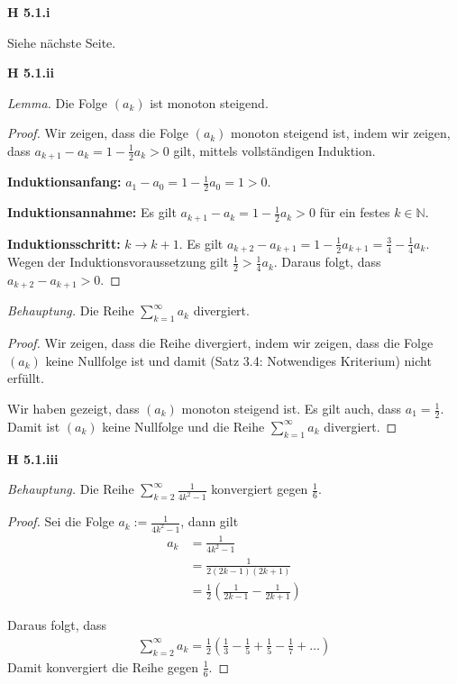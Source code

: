 \documentclass[12pt]{extarticle}
\begin{document}
\textbf{H 5.1.i}

Siehe nächste Seite.

\newpage

\textbf{H 5.1.ii}

\textit{Lemma.} Die Folge \((a_k)\) ist monoton steigend.

\begin{proof}
  Wir zeigen, dass die Folge \((a_k)\) monoton steigend ist, indem wir
  zeigen, dass \(a_{k+1}-a_k=1-\frac{1}{2}a_k>0\) gilt, mittels
  vollständigen Induktion.

  \textbf{Induktionsanfang:} \(a_1-a_0=1-\frac{1}{2}a_0=1>0\).

  \textbf{Induktionsannahme:} Es gilt \(a_{k+1}-a_k=1-\frac{1}{2}a_k>0\)
  für ein festes \(k \in \mathbb{N}\).

  \textbf{Induktionsschritt:} \(k \rightarrow k+1\). Es gilt
  \(a_{k+2}-a_{k+1}=1-\frac{1}{2}a_{k+1}=\frac{3}{4}-\frac{1}{4}a_k\).
  Wegen der Induktionsvoraussetzung gilt \(\frac{1}{2}>\frac{1}{4}a_k\).
  Daraus folgt, dass \(a_{k+2}-a_{k+1}>0\).
\end{proof}

\textit{Behauptung.}  Die Reihe \(\sum_{k=1}^{\infty}{a_k}\) divergiert.

\begin{proof}
  Wir zeigen, dass die Reihe divergiert, indem wir zeigen, dass die
  Folge \((a_k)\) keine Nullfolge ist und damit (Satz 3.4: Notwendiges
  Kriterium) nicht erfüllt.

  Wir haben gezeigt, dass \((a_k)\) monoton steigend ist.  Es gilt auch,
  dass \(a_1=\frac{1}{2}\).  Damit ist \((a_k)\) keine Nullfolge und die
  Reihe \(\sum_{k=1}^{\infty}{a_k}\) divergiert.
\end{proof}

\textbf{H 5.1.iii}

\textit{Behauptung.} Die Reihe \(\sum_{k=2}^{\infty}{\frac{1}{4k^2-1}}\)
konvergiert gegen \(\frac{1}{6}\).

\begin{proof}
  Sei die Folge \(a_k := \frac{1}{4k^2-1}\), dann gilt
\begin{align*}
  a_k&=\frac{1}{4k^2-1}\\
                &=\frac{1}{2(2k-1)(2k+1)}\\
                &=\frac{1}{2} \left( \frac{1}{2k-1} - \frac{1}{2k+1} \right)
\end{align*}

Daraus folgt, dass
\begin{align*}
  \sum_{k=2}^{\infty}{a_k} = \frac{1}{2} \left( \frac{1}{3}-\frac{1}{5}+\frac{1}{5}-\frac{1}{7}+\ldots \right)
\end{align*}
Damit konvergiert die Reihe gegen \(\frac{1}{6}\).
\end{proof}
\end{document}
